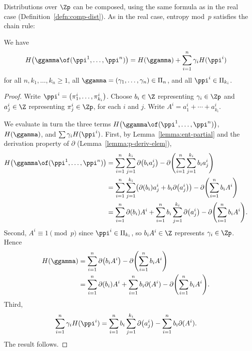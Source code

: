 Distributions over $\Zp$ can be composed, using the same formula as in the
real case (Definition~\ref{defn:comp-dist}).  As in the real case, entropy
mod~$p$ satisfies the chain rule:

\begin{propn}
%
%
%
We have
\[
H\bigl( \ggamma \of (\ppi^1, \ldots, \ppi^n) \bigr)
=
H(\ggamma) + \sum_{i = 1}^n \gamma_i H(\ppi^i)
\]
for all $n, k_1, \ldots, k_n \geq 1$, all $\ggamma = (\gamma_1, \ldots,
\gamma_n) \in \Pi_n$, and all $\ppi^i \in \Pi_{k_i}$.
\end{propn}

\begin{proof}
Write $\ppi^i = \bigl(\pi^i_1, \ldots, \pi^i_{k_i}\bigr)$.  Choose $b_i \in
\Z$ representing $\gamma_i \in \Zp$ and $a^i_j \in \Z$ representing
$\pi^i_j \in \Zp$, for each $i$ and $j$.  Write $A^i = a^i_1 + \cdots +
a^i_{k_i}$.

We evaluate in turn the three terms $H\bigl( \ggamma \of (\ppi^1, \ldots,
\ppi^n) \bigr)$, $H(\ggamma)$, and $\sum \gamma_i H(\ppi^i)$.
First, by Lemma~\ref{lemma:ent-partial} and the derivation property of
$\partial$ (Lemma~\ref{lemma:p-deriv-elem}),
% 
\begin{align*}
H\bigl( \ggamma \of (\ppi^1, \ldots, \ppi^n) \bigr)     &
=
\sum_{i = 1}^n \sum_{j = 1}^{k_i} \partial\bigl(b_i a^i_j\bigr)
-
\partial \Biggl( \sum_{i = 1}^n \sum_{j = 1}^{k_i} b_i a^i_j \Biggr)    \\
&
=
\sum_{i = 1}^n \sum_{j = 1}^{k_i}
\bigl( \partial(b_i) a^i_j + b_i \partial\bigl(a^i_j\bigr) \bigr)
-
\partial \Biggl( \sum_{i = 1}^n b_i A^i \Biggr) \\
&
=
\sum_{i = 1}^n \partial(b_i) A^i 
+ \sum_{i = 1}^n b_i \sum_{j = 1}^{k_i} \partial\bigl(a^i_j\bigr)
-
\partial \Biggl( \sum_{i = 1}^n b_i A^i \Biggr). 
\end{align*}
% 
Second, $A^i \equiv 1 \pmod{p}$ since $\ppi^i \in \Pi_{k_i}$, so
$b_i A^i \in \Z$ represents $\gamma_i \in \Zp$.  Hence
% 
\begin{align*}
H(\ggamma)      &
=
\sum_{i = 1}^n \partial\bigl(b_i A^i\bigr) 
- \partial\Biggl( \sum_{i = 1}^n b_i A^i \Biggr)        \\
&
=
\sum_{i = 1}^n \partial(b_i) A^i
+ \sum_{i = 1}^n b_i \partial(A^i)
- \partial\Biggl( \sum_{i = 1}^n b_i A^i \Biggr).        %
\end{align*}
% 
Third, 
% 
\[
\sum_{i = 1}^n \gamma_i H(\ppi^i)       
=
\sum_{i = 1}^n b_i \sum_{j = 1}^{k_i} \partial\bigl(a^i_j\bigr)
- \sum_{i = 1}^n b_i \partial(A^i).
\]
The result follows.
\end{proof}


